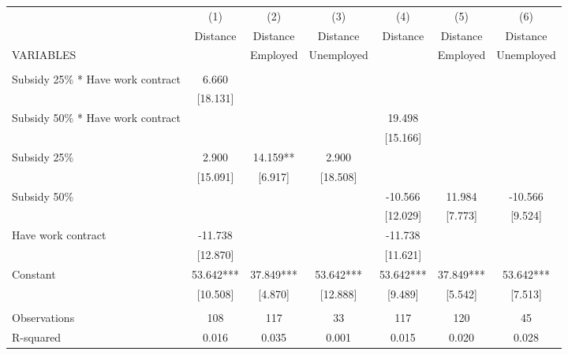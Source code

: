 \begin{tabular}{lcccccc} \hline
 & (1) & (2) & (3) & (4) & (5) & (6) \\
 & Distance & Distance & Distance & Distance & Distance & Distance \\
VARIABLES &  & Employed & Unemployed &  & Employed & Unemployed \\ \hline
 &  &  &  &  &  &  \\
Subsidy 25\% * Have work contract & 6.660 &  &  &  &  &  \\
 & [18.131] &  &  &  &  &  \\
Subsidy 50\% * Have work contract &  &  &  & 19.498 &  &  \\
 &  &  &  & [15.166] &  &  \\
Subsidy 25\% & 2.900 & 14.159** & 2.900 &  &  &  \\
 & [15.091] & [6.917] & [18.508] &  &  &  \\
Subsidy 50\% &  &  &  & -10.566 & 11.984 & -10.566 \\
 &  &  &  & [12.029] & [7.773] & [9.524] \\
Have work contract & -11.738 &  &  & -11.738 &  &  \\
 & [12.870] &  &  & [11.621] &  &  \\
Constant & 53.642*** & 37.849*** & 53.642*** & 53.642*** & 37.849*** & 53.642*** \\
 & [10.508] & [4.870] & [12.888] & [9.489] & [5.542] & [7.513] \\
 &  &  &  &  &  &  \\
Observations & 108 & 117 & 33 & 117 & 120 & 45 \\
 R-squared & 0.016 & 0.035 & 0.001 & 0.015 & 0.020 & 0.028 \\ \hline
\end{tabular}
